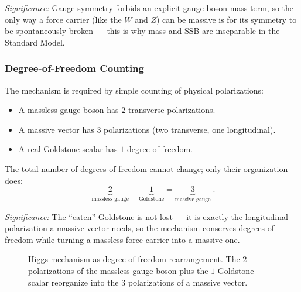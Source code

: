 \textit{Significance:} Gauge symmetry forbids an explicit gauge-boson mass term, so the only way a force carrier (like the $W$ and $Z$) can be massive is for its symmetry to be spontaneously broken --- this is why mass and SSB are inseparable in the Standard Model.

\subsubsection*{Degree-of-Freedom Counting}

The mechanism is required by simple counting of physical polarizations:
\begin{itemize}
  \item A massless gauge boson has $2$ transverse polarizations.
  \item A massive vector has $3$ polarizations (two transverse, one longitudinal).
  \item A real Goldstone scalar has $1$ degree of freedom.
\end{itemize}
The total number of degrees of freedom cannot change; only their organization does:
\begin{equation}
  \boxed{\;\underbrace{2}_{\text{massless gauge}}+\underbrace{1}_{\text{Goldstone}}
  =\underbrace{3}_{\text{massive gauge}}\; .}
  \label{eq:lec16:dof_count}
\end{equation}

\textit{Significance:} The ``eaten'' Goldstone is not lost --- it is exactly the longitudinal polarization a massive vector needs, so the mechanism conserves degrees of freedom while turning a massless force carrier into a massive one.

\begin{figure}[ht]
\centering
{}
\caption{Higgs mechanism as degree-of-freedom rearrangement. The $2$ polarizations of the massless gauge boson plus the $1$ Goldstone scalar reorganize into the $3$ polarizations of a massive vector.}
\label{fig:lec16:higgs-dof}
\end{figure}

